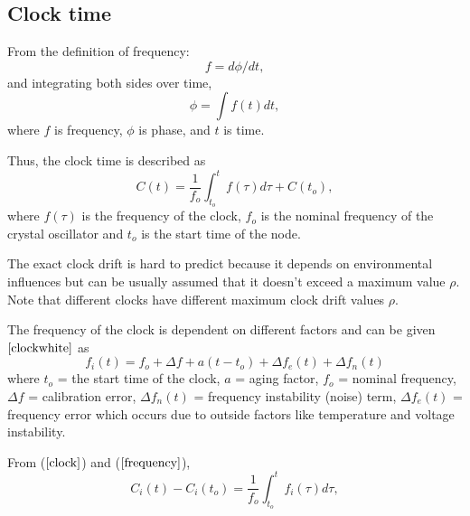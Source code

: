 \documentclass[journal]{IEEEtran}
\begin{document}
\subsection{\textbf{Clock time}}
From the definition of frequency:
\begin{equation}
f = d\phi/dt \label{freq_defn} ,
\end{equation}
and integrating both sides over time,
 \begin{equation}
\phi =\int f(t)dt ,
 \end{equation}
where $f$ is frequency, $\phi$ is phase, and $t$ is time.\par
Thus, the clock time is described as
\begin{equation}
C(t) = \dfrac{1}{f_o}\int_{t_o}^{t} {f(\tau)d\tau} + C(t_o) ,
\label{clock}
\end{equation}
where $f(\tau)$ is the frequency of the clock, $f_o$ is the nominal frequency of the crystal oscillator
and $t_o$ is the start time of the node. \par The exact clock drift is hard to predict because it depends
on environmental influences but can be usually assumed that it doesn't exceed a maximum
 value $\rho$. %
Note that different clocks have different maximum clock drift values $\rho$.\par The frequency of the clock is dependent on different
factors and can be given$\cite{clockwhite}$ as
\begin{equation}
f_i(t) = f_o + \Delta f + a(t-t_o) + \Delta
f_e(t) + \Delta f_n(t) \label{frequency}
\end{equation}
where $t_o$ = the start time of the clock, $a$ = aging factor, $f_o$ = nominal frequency,
 $\Delta f$ = calibration error, $\Delta f_n(t)$ = frequency instability (noise) term, $\Delta f_e(t)$ = frequency error which occurs due to outside factors like temperature and voltage instability. \par
From ($\ref{clock}$) and ($\ref{frequency}$),
\begin{equation}
C_i(t) - C_i(t_o) = \dfrac{1}{f_o} \int^{t}_{t_o}f_i(\tau)d\tau ,
\end{equation}
\end{document}
